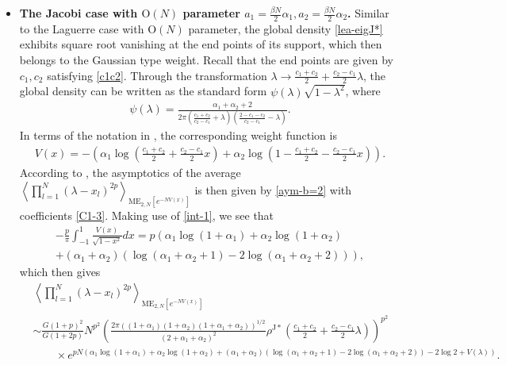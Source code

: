 \documentclass[11pt,a4paper]{article}
\numberwithin{equation}{section} %
\theoremstyle{plain}
\theoremstyle{definition}
\numberwithin{prop}{section}
\numberwithin{cor}{section}
\numberwithin{remark}{section}
\begin{document}
\begin{itemize}
    \item \textbf{The Jacobi case with $\mathrm{O}(N)$ parameter $a_1=\frac{\beta N}{2}\alpha_1,a_2=\frac{\beta N}{2}\alpha_2$.} Similar to the Laguerre case with $\mathrm{O}(N)$ parameter, the global density \eqref{lea-eigJ*} exhibits square root vanishing at the end points of its support, which then belongs to the Gaussian type weight. Recall that the end points are given by $c_1,c_2$ satisfying \eqref{c1c2}. Through the transformation $\lambda\to\frac{c_1+c_2}{2}+\frac{c_2-c_1}{2}\lambda$, the global density can be written as the standard form $\psi(\lambda)\sqrt{1-\lambda^2}$, where
    \begin{align}
        \psi(\lambda)=\frac{\alpha_1+\alpha_2+2}{2\pi \left(\frac{c_1+c_2}{c_2-c_1}+\lambda\right)\left(\frac{2-c_1-c_2}{c_2-c_1}-\lambda\right)}.
    \end{align}
    In terms of the notation in \cite{CG21}, the corresponding weight function is 
    \begin{align}
        V(x)=-\left(\alpha_1\log\left(\frac{c_1+c_2}{2}+\frac{c_2-c_1}{2}x\right)+\alpha_2\log\left(1-\frac{c_1+c_2}{2}-\frac{c_2-c_1}{2}x\right)\right).
    \end{align}
    According to \cite[Theorem 1]{CG21}, the asymptotics of the average $\left\langle\prod_{l=1}^{N}(\lambda-x_l)^{2p}\right\rangle_{\mathrm{ME}_{2,N}[e^{-NV(x)}]}$ is then given by \eqref{aym-b=2} with coefficients \eqref{C1-3}. 
    Making use of \eqref{int-1},  we see that 
    \begin{align}
        -\frac{p}{\pi}\int_{-1}^{1}\frac{V(x)}{\sqrt{1-x^2}}dx=p\left(\alpha_1\log(1+\alpha_1)+\alpha_2\log (1+\alpha_2)\right.\\
        +\left.(\alpha_1+\alpha_2)(\log(\alpha_1+\alpha_2+1)-2\log(\alpha_1+\alpha_2+2))\right),
    \end{align}
    which then gives
    \begin{align}
        &\left\langle\prod_{l=1}^{N}(\lambda-x_l)^{2p}\right\rangle_{\mathrm{ME}_{2,N}[e^{-NV(x)}]}\\
        &\sim \frac{G(1+p)^2}{G(1+2p)}N^{p^2}\left(\frac{2\pi ((1+\alpha_1)(1+\alpha_2)(1+\alpha_1+\alpha_2))^{1/2}}{(2+\alpha_1+\alpha_2)^2}\rho^{\mathrm{J}*}\left(\frac{c_1+c_2}{2}+\frac{c_2-c_1}{2}\lambda\right)\right)^{p^2}\\
        &\qquad\times e^{pN\left(\alpha_1\log(1+\alpha_1)+\alpha_2\log (1+\alpha_2)+(\alpha_1+\alpha_2)(\log(\alpha_1+\alpha_2+1)-2\log(\alpha_1+\alpha_2+2))-2\log2+V(\lambda)\right)}.
    \end{align}

\end{itemize}
\end{document}
